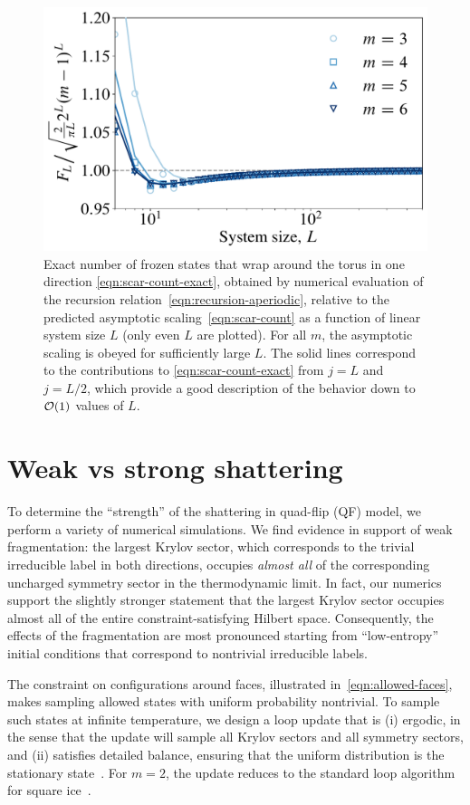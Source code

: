 \begin{figure}[ht!]
    \centering
    \includegraphics[width=0.55\linewidth]{img/exact_scar_count.pdf}
    \caption[Exact counting of frozen states]{Exact number of frozen states that wrap around the torus in one direction \eqref{eqn:scar-count-exact}, obtained by numerical evaluation of the recursion relation~\eqref{eqn:recursion-aperiodic}, relative to the predicted asymptotic scaling~\eqref{eqn:scar-count} as a function of linear system size $L$ (only even $L$ are plotted). For all $m$, the asymptotic scaling is obeyed for sufficiently large $L$. The solid lines correspond to the contributions to \eqref{eqn:scar-count-exact} from $j = L$ and $j = L/2$, which provide a good description of the behavior down to $\cal{O}(1)$ values of $L$.}
    \label{fig:scar-count}
\end{figure}


\section{Weak vs strong shattering}
\label{app:weak-vs-strong}

To determine the ``strength'' of the shattering in quad-flip (QF) model, we perform a variety of numerical simulations.
We find evidence in support of weak fragmentation: the largest Krylov sector, which corresponds to the trivial irreducible label in both directions, occupies \emph{almost all} of the corresponding uncharged symmetry sector in the thermodynamic limit. In fact, our numerics support the slightly stronger statement that the largest Krylov sector occupies almost all of the entire constraint-satisfying Hilbert space. Consequently, the effects of the fragmentation are most pronounced starting from ``low-entropy'' initial conditions that correspond to nontrivial irreducible labels.

The constraint on configurations around faces, illustrated in~\eqref{eqn:allowed-faces}, makes sampling allowed states with uniform probability nontrivial.
To sample such states at infinite temperature, we design a loop update that is (i) ergodic, in the sense that the update will sample all Krylov sectors and all symmetry sectors, and (ii) satisfies detailed balance, ensuring that the uniform distribution is the stationary state~\cite{newman1999monte,levin2017markov}.
For $m=2$, the update reduces to the standard loop algorithm for square ice~\cite{BarkemaMonteCarlo}.

